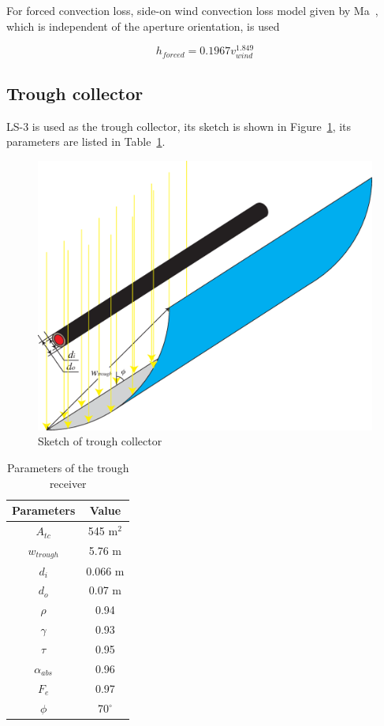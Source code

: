 \documentclass{article}
\begin{document}
For forced convection loss, side-on wind convection loss model given by Ma~\cite{Ma1993}, which is independent of the aperture orientation, is used

\begin{equation*}
	h_{forced}=0.1967v_{wind}^{1.849}
\end{equation*}

\subsection{Trough collector}

LS-3 is used as the trough collector, its sketch is shown in Figure~\ref{fig:tc}, its parameters are listed in Table~\ref{tab:tc}.

\noindent \begin{figure}[htbp]
\begin{center}
	\includegraphics[width = 0.7\columnwidth]{./graphics/TroughCollector}
	\caption{Sketch of trough collector}
	\label{fig:tc}
\end{center}
\end{figure}

\begin{table}[htbp]
	\caption{Parameters of the trough receiver}
	\begin{center}
	\begin{tabular}{cc}
		\toprule
		Parameters	&	Value\\
		\midrule
		$A_{tc}$	&	545 m$^2$\\
		$w_{trough}$&	5.76 m\\
		$d_i$		&	0.066 m\\
		$d_o$	&	0.07 m\\
		$\rho$		&	0.94\\
		$\gamma$	&	0.93\\
		$\tau$		&	0.95\\
		$\alpha_{abs}$	&	0.96\\
		$F_e$		&	0.97\\
		$\phi$	&	70$^\circ$\\
		\bottomrule
	\end{tabular}
	\end{center}
	\label{tab:tc}
\end{table}
\end{document}
